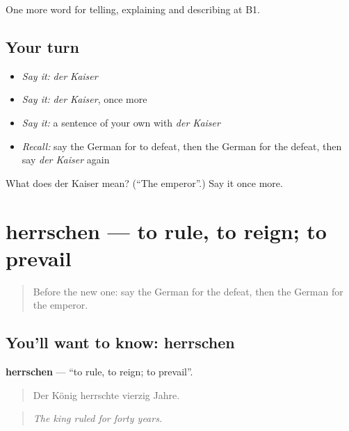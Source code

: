 \begin{grammarlens}[title={What you've built}]
One more word for telling, explaining and describing at B1.
\end{grammarlens}

\subsection*{Your turn}
\begin{itemize}
\raggedright
  \item \emph{Say it:} \emph{der Kaiser}
  \item \emph{Say it:} \emph{der Kaiser}, once more
  \item \emph{Say it:} a sentence of your own with \emph{der Kaiser}
  \item \emph{Recall:} say the German for to defeat, then the German for the defeat, then say \emph{der Kaiser} again
\end{itemize}

\begin{tcolorbox}[breakable,colback=teal!4,colframe=teal!35!black,title={Before you move on}]
What does der Kaiser mean? (\textquotedblleft{}The emperor\textquotedblright{}.) Say it once more.
\end{tcolorbox}
\section[herrschen]{herrschen — to rule, to reign; to prevail}

\label{lesson:GE-C319-herrschen}



\begin{quote}
Before the new one: say the German for the defeat, then the German for the emperor.
\end{quote}

\subsection*{You'll want to know: herrschen}
\textbf{herrschen} — \textquotedblleft{}to rule, to reign; to prevail\textquotedblright{}.

\begin{quote}
Der König herrschte vierzig Jahre.
\end{quote}

\begin{quote}
\emph{The king ruled for forty years.}
\end{quote}

